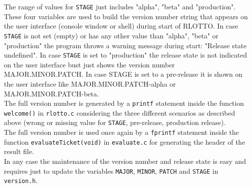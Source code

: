 \documentclass[10pt,a4paper]{article}
\begin{document}
The range of values for \texttt{STAGE} just includes "alpha", "beta" and "production". These four variables are used to build the version number string that appears on the user interface (console window or shell) during start of RLOTTO. In case \texttt{STAGE} is not set (empty) or has any other value than "alpha", "beta" or "production" the program throws a warning message during start: "Release state undefined". In case \texttt{STAGE} is set to "production" the release state is not indicated on the user interface bust just shows the version number MAJOR.MINOR.PATCH. In case STAGE is set to a pre-release it is shown on the user interface like MAJOR.MINOR.PATCH-alpha or MAJOR.MINOR.PATCH-beta.
\\

The full version number is generated by a \texttt{printf} statement inside the function \texttt{welcome()} in \texttt{rlotto.c} considering the three different scenarios as described above (wrong or missing value for \texttt{STAGE}, pre-release, production release).
\\

The full version number is used once again by a \texttt{fprintf} statement inside the function \texttt{evaluateTicket(void)} in \texttt{evaluate.c} for generating the header of the result file.
\\

In any case the maintenance of the version number and release state is easy and requires just to update  the variables \texttt{MAJOR}, \texttt{MINOR}, \texttt{PATCH} and \texttt{STAGE} in \texttt{version.h}. 


\end{document}
